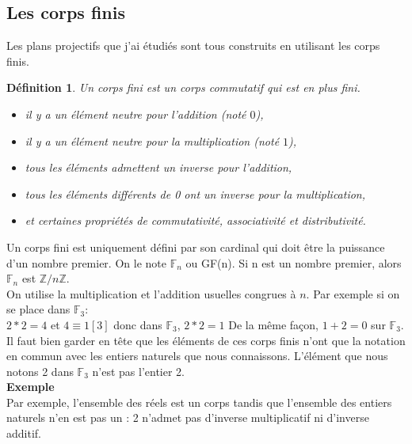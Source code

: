 \documentclass[a4paper]{article}
\newtheorem{Def}{Définition}[section]
\begin{document}
\subsection{Les corps finis}
Les plans projectifs que j'ai étudiés sont tous construits en utilisant les corps finis.
\begin{Def}
  Un corps fini est un corps commutatif qui est en plus fini.\\
  \begin{itemize}
\item il y a un élément neutre pour l'addition (noté $0$),
\item il y a un élément neutre pour la multiplication (noté $1$),
\item tous les éléments admettent un inverse pour l'addition,
\item tous les éléments différents de 0 ont un inverse pour la multiplication,
\item et certaines propriétés de commutativité, associativité et distributivité.
  \end{itemize}
  \end{Def}
Un corps fini est uniquement défini par son cardinal qui doit être la puissance d'un nombre premier. On le note $\mathbb{F}_n$ ou GF(n).
Si n est un nombre premier, alors $\mathbb{F}_n$ est $\mathbb{Z}/n\mathbb{Z}$.\\
  On utilise la multiplication et l'addition usuelles congrues à $n$. Par exemple si on se place dans $\mathbb{F}_3$:\\
  $2*2=4$ et $4 \equiv 1 [3]$ donc dans $\mathbb{F}_3$, $2*2=1$
  De la même façon, $1+2=0$ sur $\mathbb{F}_3$\vspace{1\baselineskip}.\\
Il faut bien garder en tête que les éléments de ces corps finis n'ont que la notation en commun avec les entiers naturels que nous connaissons. L'élément que nous notons 2 dans $\mathbb{F}_3$ n'est pas l'entier 2.\vspace{1\baselineskip}\\
\textbf{Exemple}\\
  Par exemple, l'ensemble des réels est un corps tandis que l'ensemble des entiers naturels n'en est pas un : 2 n'admet pas d'inverse multiplicatif ni d'inverse additif.
\end{document}
